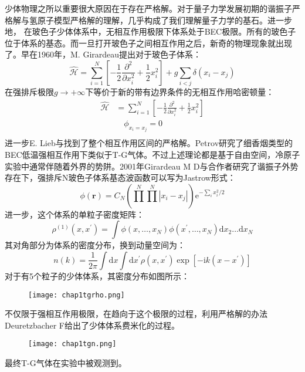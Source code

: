 少体物理之所以重要很大原因在于存在严格解。对于量子力学发展初期的谐振子严格解与氢原子模型严格解的理解，几乎构成了我们理解量子力学的基石。进一步地，
在玻色子少体体系中，无相互作用极限下体系处于BEC极限。所有的玻色子位于体系的基态。而一旦打开玻色子之间相互作用之后，新奇的物理现象就出现了。早在1960年，M. Girardeau提出对于玻色子体系：
\begin{equation}
\hat{\mathcal{H}}=\sum_{i=1}^{N}\left[-\frac{1}{2} \frac{\partial^{2}}{\partial x_{i}^{2}}+\frac{1}{2} x_{i}^{2}\right]+g \sum_{i<j} \delta\left(x_{i}-x_{j}\right)
\end{equation}
在强排斥极限$g\to+\infty$下等价于新的带有边界条件的无相互作用哈密顿量：
\begin{equation}
\begin{split}
\hat{\mathcal{H}}&=\sum_{i=1}^{N}\left[-\frac{1}{2} \frac{\partial^{2}}{\partial x_{i}^{2}}+\frac{1}{2} x_{i}^{2}\right]\\
&\quad \phi_{x_i=x_j}=0\\
\end{split}
\end{equation}
进一步E. Lieb与找到了整个相互作用区间的严格解。Petrov研究了细香烟类型的BEC低温强相互作用下类似于T-G气体。不过上述理论都是基于自由空间，冷原子实验中通常伴随着外界的势阱。2001年Girardeau M D与合作者研究了谐振子外势存在下，强排斥N玻色子体系基态波函数可以写为Jastrow形式：
\begin{equation}
\phi(\boldsymbol{r})=C_{N}\left(\prod^{N} \prod^{N}\left|x_{i}-x_{j}\right|\right) \mathrm{e}^{-\sum_{i} x_{i}^{2} / 2}
\end{equation}
进一步，这个体系的单粒子密度矩阵：
\begin{equation}
\rho^{(1)}\left(x, x^{\prime}\right)=\int \phi\left(x, \ldots, x_{N}\right) \phi\left(x^{\prime}, \ldots, x_{N}\right) \mathrm{d} x_{2} \ldots \mathrm{d} x_{N}
\end{equation}
其对角部分为体系的密度分布，换到动量空间为：
\begin{equation}
n(k)=\frac{1}{2 \pi} \int \mathrm{d} x \int \mathrm{d} x^{\prime} \rho\left(x, x^{\prime}\right) \exp \left[-\mathrm{i} k\left(x-x^{\prime}\right)\right]
\end{equation}
对于有5个粒子的少体体系，其密度分布如图所示：
\begin{figure}[!htbp]
    \centering
    \texttt{[image: chap1tgrho.png]}
    \label{chap1tgrho}
\end{figure}
不仅限于强相互作用极限，在趋向于这个极限的过程，利用严格解的办法{\color{red}Deuretzbacher F给出了少体体系费米化的过程}。
\begin{figure}[!htbp]
    \centering
    \texttt{[image: chap1tgn.png]}
    \label{chap1tgn}
\end{figure}
最终T-G气体在实验中被观测到。


